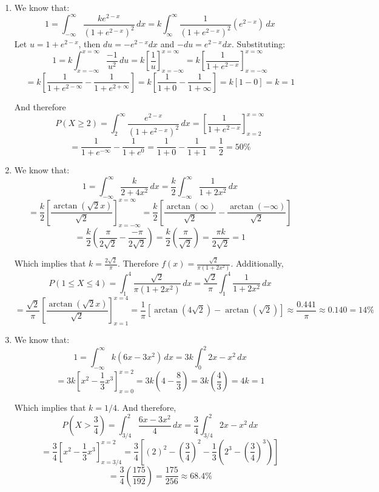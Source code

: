 \begin{Answer}[ref = int_pdf]
\begin{enumerate}
    \item We know that:
    $$1 = \int_{-\infty}^{\infty} \frac{ke^{2 - x}}{\left(1 + e^{2 - x} \right)
    ^2}\,dx = k \int_{\infty}^{\infty} \frac{1}{\left(1 + e^{2 - x} \right)^2} 
    \left( e^{2 - x} \right)\,dx$$
    Let $u = 1 + e^{2 - x}$, then $du = -e^{2 - x}dx$ and $-du = e^{2 - x}dx$. 
    Substituting:
    $$1 = k \int_{x = -\infty}^{x = \infty} \frac{-1}{u^2}\,du = k \left[\frac{
    1}{u} \right]_{x = -\infty}^{x = \infty} = k \left[\frac{1}{1 + e^{2 - x}} 
    \right]_{x = -\infty}^{x = \infty}$$
    $$= k \left[ \frac{1}{1 + e^{2 - \infty}} - \frac{1}{1 + e^{2 + \infty}} 
    \right] = k \left[ \frac{1}{1 + 0} - \frac{1}{1 + \infty} \right] = k [1 - 
    0] = k = 1$$

    And therefore
    $$P(X \geq 2) = \int_{2}^{\infty} \frac{e^{2 - x}}{\left(1 + e^{2 - x} 
    \right)^2}\,dx = \left[ \frac{1}{1 + e^{2 - x}} \right]_{x = 2}^{x = 
    \infty}$$
    $$= \frac{1}{1 + e^{-\infty}} - \frac{1}{1 + e^{0}} = \frac{1}{1 + 0} - 
    \frac{1}{1 + 1} = \frac{1}{2} = 50\%$$

    \item We know that:
    $$1 = \int_{-\infty}^{\infty} \frac{k}{2 + 4x^2}\,dx = \frac{k}{2} \int_{-
    \infty}^{\infty} \frac{1}{1 + 2x^2}\,dx$$
    $$= \frac{k}{2} \left[ \frac{\arctan{(\sqrt{2}x)}}{\sqrt{2}} \right]_{x = -
    \infty}^{x = \infty} = \frac{k}{2} \left[ \frac{\arctan{(\infty)}}{
    \sqrt{2}} - \frac{\arctan{(-\infty)}}{\sqrt{2}} \right] $$
    $$= \frac{k}{2} \left( \frac{\pi}{2\sqrt{2}} - \frac{-\pi}{2\sqrt{2}} 
    \right) = \frac{k}{2} \left( \frac{\pi}{\sqrt{2}} \right) = \frac{\pi k}{2
    \sqrt{2}} = 1$$

    Which implies that $k = \frac{2\sqrt{2}}{\pi}$. Therefore $f(x) = \frac{
    \sqrt{2}}{\pi \left(1 + 2x^2 \right)}$. Additionally, 
    $$P(1 \leq X \leq 4) = \int_1^4 \frac{\sqrt{2}}{\pi \left(1 + 2x^2 \right)
    }\,dx = \frac{\sqrt{2}}{\pi} \int_1^4 \frac{1}{1 + 2x^2}\,dx$$
    $$= \frac{\sqrt{2}}{\pi} \left[ \frac{\arctan{(\sqrt{2}x)}}{\sqrt{2}} 
    \right]_{x = 1}^{x = 4} = \frac{1}{\pi} \left[ \arctan{(4\sqrt{2})} - 
    \arctan{(\sqrt{2})} \right] \approx \frac{0.441}{\pi} \approx 0.140 = 14\%$$

    \item We know that:
    $$1 = \int_{-\infty}^{\infty} k \left(6x - 3x^2 \right)\,dx = 3k \int_{0}^{
    2} 2x - x^2\,dx$$
    $$= 3k \left[x^2 - \frac{1}{3}x^3 \right]_{x = 0}^{x = 2} = 3k \left( 4 - 
    \frac{8}{3} \right) = 3k \left( \frac{4}{3} \right) = 4k = 1$$

    Which implies that $k = 1/4$. And therefore,
    $$P(X > \frac{3}{4} ) = \int_{3/4}^2 \frac{6x - 3x^2}{4}\,dx = \frac{3}{4} 
    \int_{3/4}^2 2x - x^2\,dx$$
    $$= \frac{3}{4} \left[ x^2 - \frac{1}{3}x^3 \right]_{x = 3/4}^{x = 2} = 
    \frac{3}{4} \left[ (2)^2 - \left( \frac{3}{4} \right)^2 - \frac{1}{3} 
    \left( 2^3 - \left( \frac{3}{4} \right)^3 \right) \right]$$
    $$= \frac{3}{4} \left( \frac{175}{192} \right) = \frac{175}{256} \approx 
    68.4\%$$
\end{enumerate}
\end{Answer}

